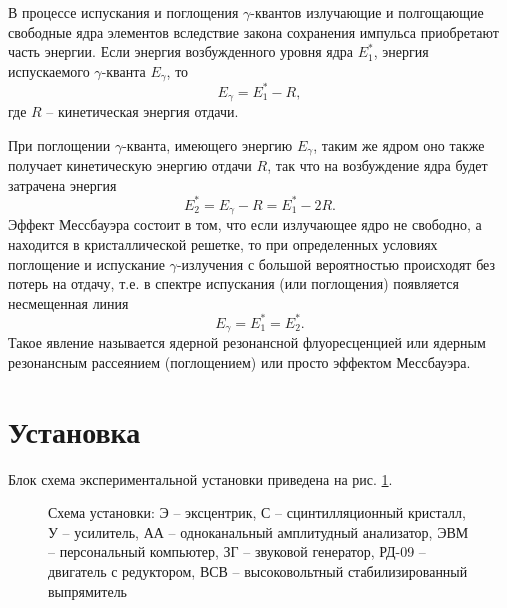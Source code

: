 \documentclass[12pt,a4paper]{article}
\begin{document}
В процессе испускания и поглощения $\gamma$-квантов излучающие и полгощающие свободные ядра элементов вследствие закона сохранения импульса приобретают часть энергии. Если энергия возбужденного уровня ядра $E_1^*$, энергия испускаемого $\gamma$-кванта $E_\gamma$, то 
\begin{equation}
E_\gamma = E_1^* - R,
\end{equation}
где $R$ -- кинетическая энергия отдачи.

При поглощении $\gamma$-кванта, имеющего энергию $E_\gamma$, таким же ядром оно также получает кинетическую энергию отдачи $R$, так что на возбуждение ядра будет затрачена энергия 
\begin{equation}
E_2^* = E_\gamma - R = E_1^* - 2R.
\end{equation}
Эффект Мессбауэра состоит в том, что если излучающее ядро не свободно, а находится в кристаллической решетке, то при определенных условиях поглощение и испускание $\gamma$-излучения с большой вероятностью происходят без потерь на отдачу, т.е. в спектре испускания (или поглощения) появляется несмещенная линия 
\begin{equation}
E_\gamma = E_1^* = E_2^*.
\end{equation}
Такое явление называется ядерной резонансной флуоресценцией или ядерным резонансным рассеянием (поглощением) или просто эффектом Мессбауэра. 
\section{Установка}
Блок схема экспериментальной установки приведена на рис. \ref{scheme}.

\begin{figure}[ht] \label{scheme} 
\caption{Схема установки: Э -- эксцентрик, С -- сцинтилляционный кристалл, У -- усилитель, АА -- одноканальный амплитудный анализатор, ЭВМ -- персональный компьютер, ЗГ -- звуковой генератор, РД-09 -- двигатель с редуктором, ВСВ -- высоковольтный стабилизированный выпрямитель}
\end{figure}
\end{document}
